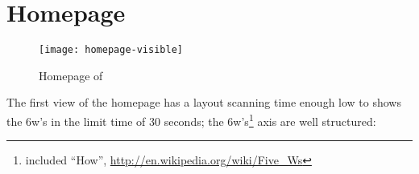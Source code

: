 \documentclass[
10pt, %
a4paper, %
oneside, %
headinclude,footinclude, %
BCOR5mm, %
]{scrartcl}
\begin{document}

\section{Homepage}
\label{homepage}

\begin{figure}[h]
\centering 
\centerline{\texttt{[image: homepage-visible]}}
\caption[Homepage]{Homepage of \thesite{}}
\label{fig:homepage} 
\end{figure}

The first view of the homepage has a layout scanning time enough low to shows the 6w's in the limit time of 30 seconds; the 6w's\footnote{included ``How'', \url{http://en.wikipedia.org/wiki/Five_Ws}} axis are well structured:
\end{document}
